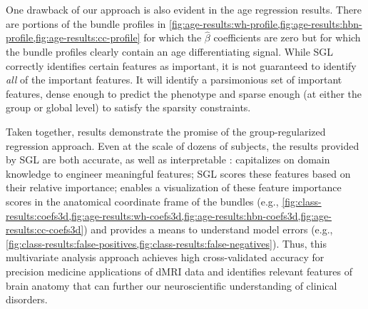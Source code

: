 \documentclass[10pt,letterpaper]{article}
\begin{document}

One drawback of our approach is also evident in the age regression results.
There are portions of the bundle profiles in
\cref{fig:age-results:wh-profile,fig:age-results:hbn-profile,fig:age-results:cc-profile}
for which the $\hat{\beta}$ coefficients are zero but for which the bundle
profiles clearly contain an age differentiating signal. While SGL correctly
identifies certain features as important, it is not guaranteed to identify
\emph{all} of the important features. It will identify a parsimonious set of
important features, dense enough to predict the phenotype and sparse enough
(at either the group or global level) to satisfy the sparsity constraints.


Taken together,  results demonstrate the promise of the
group-regularized regression approach. Even at the scale of dozens of
subjects, the results provided by SGL are both accurate, as well as
interpretable \cite{Murdoch2019-ax}:  capitalizes on domain
knowledge to engineer meaningful features; SGL scores these features based on
their relative importance; enables a visualization of these feature
importance scores in the anatomical coordinate frame of the bundles (e.g.,
\cref{fig:class-results:coefs3d,fig:age-results:wh-coefs3d,fig:age-results:hbn-coefs3d,fig:age-results:cc-coefs3d})
and provides a means to understand model errors (e.g.,
\cref{fig:class-results:false-positives,fig:class-results:false-negatives}).
Thus, this multivariate analysis approach achieves high cross-validated
accuracy for precision medicine applications of dMRI data and identifies
relevant features of brain anatomy that can further our neuroscientific
understanding of clinical disorders.
\end{document}
